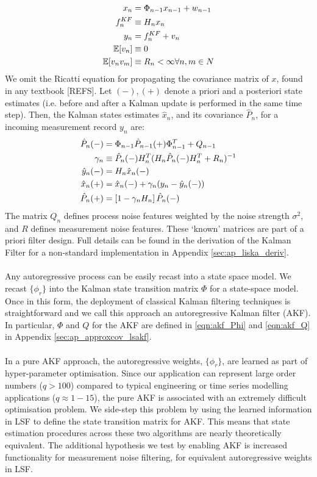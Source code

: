 \begin{align}
x_n & = \Phi_{n-1} x_{n-1} + w_{n-1} \\
f_n^{KF} & \equiv H_n x_n \\ \label{eqn:main:f_true_KF}
y_n & = f_n^{KF} + v_n \\
\mathbb{E}[v_n] &\equiv 0 \\
\mathbb{E}[v_n v_m] &\equiv R_n < \infty  \forall n,m  \in N 
\end{align}
We omit the Ricatti equation for propagating the covariance matrix of $x$, found in any textbook [REFS]. Let $(-), (+)$ denote a priori and a posteriori state estimates (i.e. before and after a Kalman update is performed in the same time step). Then, the Kalman states estimates $\hat{x}_n$, and its covariance $\hat{P}_n$, for a incoming measurement record $y_n$ are:
\begin{align}
\hat{P}_{n}(-)&= \Phi_{n-1} \hat{P}_{n-1}(+) \Phi_{n-1}^T + Q_{n-1} \\
\gamma_n &\equiv \hat{P}_{n}(-) H_n^T(H_n\hat{P}_{n}(-)H_n^T + R_n)^{-1} \\
\hat{y}_n(-) & = H_n \hat{x}_{n}(-) \\
\hat{x}_{n}(+) &= \hat{x}_{n}(-) + \gamma_n (y_n - \hat{y}_n(-)) \\
\hat{P}_{n}(+) &= \left[1  - \gamma_n H_n \right] \hat{P}_{n}(-)
\end{align}
The matrix $Q_n$ defines process noise features weighted by the noise strength $\sigma^2$, and $R$ defines measurement noise features. These `known' matrices are part of a priori filter design. Full details can be found in the derivation of the Kalman Filter for a non-standard implementation in Appendix \ref{sec:ap_liska_deriv}.
\\
\\
Any autoregressive process can be easily recast into a state space model. We recast $\{\phi_r\}$ into the Kalman state transition matrix $\Phi$ for a state-space model. Once in this form, the deployment of classical Kalman filtering techniques is straightforward and we call this approach an autoregressive Kalman filter (AKF). In particular, $\Phi$ and $Q$ for the AKF are defined in \eqref{eqn:akf_Phi} and \eqref{eqn:akf_Q} in Appendix \ref{sec:ap_approxcov_lsakf}.
\\
\\
In a pure AKF approach, the autoregressive weights, $\{\phi_r\}$, are learned as part of hyper-parameter optimisation. Since our application can represent large order numbers ($q>100$) compared to typical engineering or time series modelling applications ($ q \approx 1 - 15$), the pure AKF is associated with an extremely difficult optimisation problem. We side-step this problem by using the learned information in LSF to define the state transition matrix for AKF. This means that state estimation procedures across these two algorithms are nearly theoretically equivalent. The additional hypothesis we test by enabling AKF is increased functionality for measurement noise filtering, for equivalent autoregressive weights in LSF.
